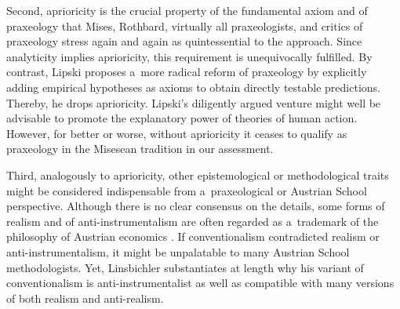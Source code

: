 Second, aprioricity is the crucial property of the fundamental axiom and of praxeology that Mises, Rothbard, virtually all praxeologists, and critics of praxeology stress again and again as quintessential to the approach. Since analyticity implies aprioricity, this requirement is unequivocally fulfilled. By contrast, Lipski 
\parencite*[][]{lipski_austrian_2021} %
 proposes a~more radical reform of praxeology by explicitly adding empirical hypotheses as axioms to obtain directly testable predictions. Thereby, he drops aprioricity. Lipski's diligently argued venture might well be advisable to promote the explanatory power of theories of human action. However, for better or worse, without aprioricity it ceases to qualify as praxeology in the Misesean tradition in our assessment.



Third, analogously to aprioricity, other epistemological or methodological traits might be considered indispensable from a~praxeological or Austrian School perspective. Although there is no clear consensus on the details, some forms of realism and of anti-instrumentalism are often regarded as a~trademark of the philosophy of Austrian economics 
\parencites[][]{heilmann_philosophy_2021}[][]{linsbichler_philosophy_2021}. %
 If conventionalism contradicted realism or anti-instrumentalism, it might be unpalatable to many Austrian School methodologists. Yet, Linsbichler 
\parencite*[][pp.3380–3383]{linsbichler_austrian_2021} %
 substantiates at length why his variant of conventionalism is anti-instrumentalist as well as compatible with many versions of both realism and anti-realism.



